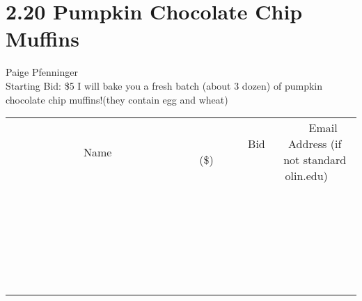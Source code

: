 \documentclass[11pt]{article}
\begin{document}
\section*{2.20 Pumpkin Chocolate Chip Muffins }
Paige Pfenninger
\\
Starting Bid: \$5
\newline
I will bake you a fresh batch (about 3 dozen) of pumpkin chocolate chip muffins!(they contain egg and wheat)
\\[6ex]
\begin{tabular}{c c c}
~~~~~~~~~~~~~Name~~~~~~~~~~~~~ & ~~~~~~~~~Bid (\$)~~~~~~~~~  & ~~~Email Address (if not standard olin.edu)~~~\\
 & & \\
\hline
 & & \\
\hline
 & & \\
\hline
 & & \\
\hline
 & & \\
\hline
 & & \\
\hline
 & & \\
\hline
 & & \\
\hline
 & & \\
\hline
 & & \\
\hline
 & & \\
\hline
 & & \\
\hline
 & & \\
\hline
 & & \\
\hline
 & & \\
\hline
 & & \\
\hline
 & & \\
\hline
 & & \\
\hline
 & & \\
\hline
 & & \\
\hline
 & & \\
\hline
 & & \\
\hline
 & & \\
\hline
 & & \\
\hline
 & & \\
\hline
 & & \\
\hline
\end{tabular}
\newpage
\end{document}
